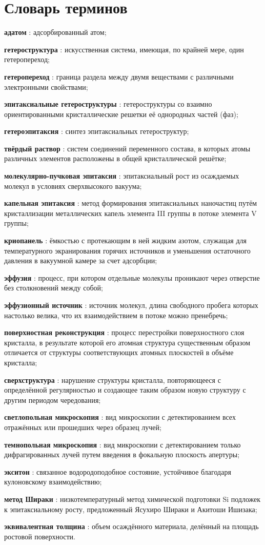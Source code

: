 \chapter*{Словарь терминов}             %
\textbf{адатом} : адсорбированный атом;

\textbf{гетероструктура} : искусственная система, имеющая, по крайней мере, один гетеропереход;

\textbf{гетеропереход} : граница раздела между двумя веществами с различными электронными свойствами;

\textbf{эпитаксиальные гетероструктуры} : гетероструктуры со взаимно ориентированными кристаллические решетки её однородных частей (фаз);

\textbf{гетероэпитаксия} : синтез  эпитаксиальных гетероструктур;

\textbf{твёрдый раствор} : систем соединений переменного состава, в которых атомы различных элементов расположены в общей кристаллической решётке;

\textbf{молекулярно-пучковая эпитаксия} : эпитаксиальный рост из осаждаемых молекул в условиях сверхвысокого вакуума;

\textbf{капельная эпитаксия} : метод формирования эпитаксиальных наночастиц путём кристаллизации металлических капель элемента III группы в потоке элемента V группы;

\textbf{криопанель} : ёмкостью с протекающим в ней жидким азотом, служащая для температурного экранирования горячих источников и уменьшения остаточного давления в вакуумной камере за счет адсорбции;

\textbf{эффузия} : процесс, при котором отдельные молекулы проникают через отверстие без столкновений между собой;

\textbf{эффузионный источник} : источник молекул, длина свободного пробега которых настолько велика, что их взаимодействием в потоке можно пренебречь;

\textbf{поверхностная реконструкция} : процесс перестройки поверхностного слоя кристалла, в результате которой его атомная структура существенным образом отличается от структуры соответствующих атомных плоскостей в объёме кристалла;

\textbf{сверхструктура} : нарушение структуры кристалла, повторяющееся с определённой регулярностью и создающее таким образом новую структуру с другим периодом чередования;

\textbf{светлопольная микроскопия} : вид микроскопии с детектированием всех отражённых или прошедших через образец лучей;

\textbf{темнопольная микроскопия} : вид микроскопии с детектированием только дифрагированных лучей путем введения в фокальную плоскость апертуры;

\textbf{экситон} : связанное водородоподобное состояние, устойчивое благодаря кулоновскому взаимодействию;

\textbf{метод Шираки} : низкотемпературный метод химической подготовки Si подложек к эпитаксиальному росту, предложенный Ясухиро Шираки и Акитоши Ишизака;

\textbf{эквивалентная толщина} : объем осаждённого материала, делённый на площадь ростовой поверхности.
